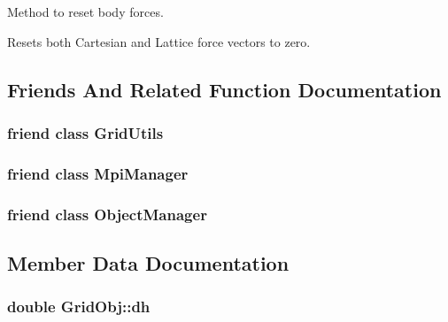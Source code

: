 Method to reset body forces. 

Resets both Cartesian and Lattice force vectors to zero. 

\subsection{Friends And Related Function Documentation}
\subsubsection[{\texorpdfstring{Grid\+Utils}{GridUtils}}]{\setlength{\rightskip}{0pt plus 5cm}friend class {\bf Grid\+Utils}\hspace{0.3cm}{\ttfamily [friend]}}\hypertarget{class_grid_obj_a8891d532b9568ad83535721b0e6b79c9}{}\label{class_grid_obj_a8891d532b9568ad83535721b0e6b79c9}
\subsubsection[{\texorpdfstring{Mpi\+Manager}{MpiManager}}]{\setlength{\rightskip}{0pt plus 5cm}friend class {\bf Mpi\+Manager}\hspace{0.3cm}{\ttfamily [friend]}}\hypertarget{class_grid_obj_a831466b4226dde3791b04756e4cfa6fc}{}\label{class_grid_obj_a831466b4226dde3791b04756e4cfa6fc}
\subsubsection[{\texorpdfstring{Object\+Manager}{ObjectManager}}]{\setlength{\rightskip}{0pt plus 5cm}friend class {\bf Object\+Manager}\hspace{0.3cm}{\ttfamily [friend]}}\hypertarget{class_grid_obj_a8b86bdcdb7c54a536293d8632363e114}{}\label{class_grid_obj_a8b86bdcdb7c54a536293d8632363e114}


\subsection{Member Data Documentation}
\subsubsection[{\texorpdfstring{dh}{dh}}]{\setlength{\rightskip}{0pt plus 5cm}double Grid\+Obj\+::dh}\hypertarget{class_grid_obj_a4efe4f79d600da2f459a0cc08b89b40c}{}\label{class_grid_obj_a4efe4f79d600da2f459a0cc08b89b40c}


